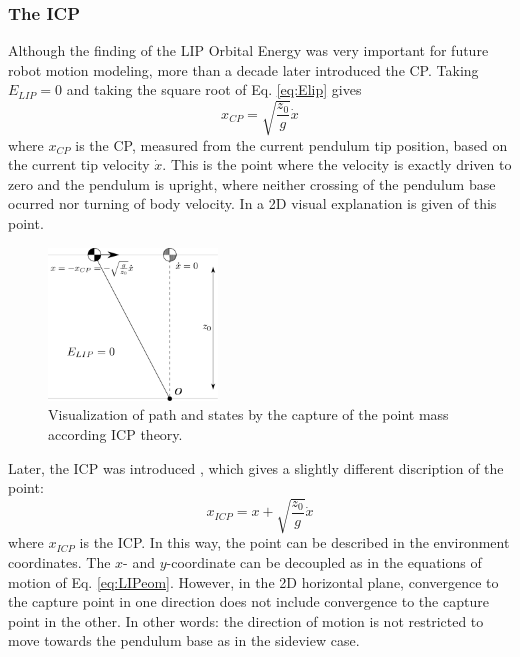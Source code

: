 \subsubsection{The \acf{ICP}}
Although the finding of the \ac{LIP} Orbital Energy was very important for future robot motion modeling, more than a decade later \cite{pratt2006capture} introduced the \ac{CP}. Taking $E_{LIP}=0$ and taking the square root of Eq.  \eqref{eq:Elip} gives
\begin{equation}
x_{CP}=\sqrt{ \frac{z_0}{g}}\dot{x} 
\label{eq:cp}
\end{equation}
where $x_{CP}$ is the \ac{CP}, measured from the current pendulum tip position, based on the current tip velocity $\dot{x}$. This is the point where the velocity is exactly driven to zero and the pendulum is upright, where neither crossing of the pendulum base ocurred nor turning of body velocity. In  a \ac{2D} visual explanation is given of this point.
\begin{figure}[h]
\centering
\includegraphics[width=0.4\textwidth]{STYLESTUFF/2DICP.png}
\caption{Visualization of path and states by the capture of the point mass according \ac{ICP} theory.}
\label{fig:2dicp}
\end{figure}
Later, the \ac{ICP} was introduced \cite{koolen2012capturability}, which gives a slightly different discription of the point:
\begin{equation}
x_{ICP}=x+\sqrt{ \frac{z_0}{g}}\dot{x} 
\label{eq:icp}
\end{equation}
where $x_{ICP}$ is the \ac{ICP}. In this way, the point can be described in the environment coordinates.
The $x$- and $y$-coordinate can be decoupled as in the equations of motion of Eq. \eqref{eq:LIPeom}. However, in the \ac{2D} horizontal plane, convergence to the capture point in one direction does not include convergence to the capture point in the other. In other words: the direction of motion is not restricted to move towards the pendulum base as in the sideview case.
